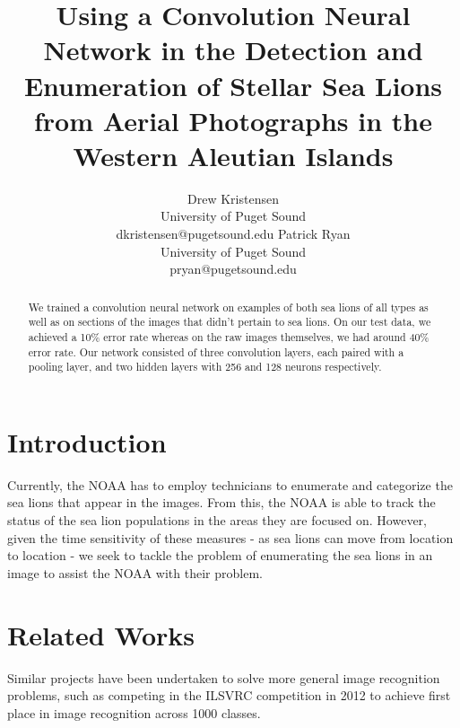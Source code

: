 \documentclass[letterpaper]{article}
\begin{document}
%
\title{Using a Convolution Neural Network in the Detection and Enumeration of Stellar Sea Lions from Aerial Photographs in the Western Aleutian Islands}
\author{
Drew Kristensen \\
University of Puget Sound\\
dkristensen@pugetsound.edu
\And
Patrick Ryan\\
University of Puget Sound\\
pryan@pugetsound.edu
}

\maketitle
\begin{abstract}
We trained a convolution neural network on examples of both sea lions of all types as well as on sections of the images that didn't pertain to sea lions. On our test data, we achieved a 10\% error rate whereas on the raw images themselves, we had around 40\% error rate. Our network consisted of three convolution layers, each paired with a pooling layer, and two hidden layers with 256 and 128 neurons respectively.
\end{abstract}

\section{Introduction}
Currently, the NOAA has to employ technicians to enumerate and categorize the sea lions that appear in the images. From this, the NOAA is able to track the status of the sea lion populations in the areas they are focused on. However, given the time sensitivity of these measures - as sea lions can move from location to location - we seek to tackle the problem of enumerating the sea lions in an image to assist the NOAA with their problem.

\section{Related Works}
Similar projects have been undertaken to solve more general image recognition problems, such as competing in the ILSVRC competition in 2012 to achieve first place in image recognition across 1000 classes.

\end{document}
